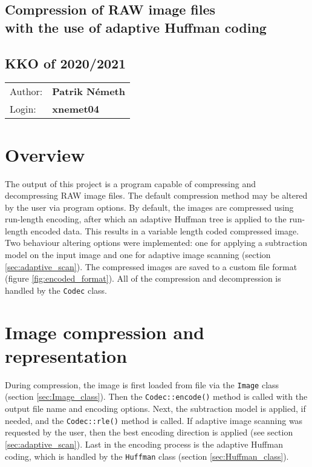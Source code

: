 \documentclass[pdftex, 11pt, a4paper, titlepage]{article}
\newcommand{\code}{\texttt}
\begin{document}
    \begin{center}
        \section*{Compression of RAW image files\\with the use of adaptive Huffman coding}
        \subsection*{KKO of 2020/2021}
        \begin{tabular}{ l l }
            Author: & \textbf{Patrik Németh} \\
            Login: & \textbf{xnemet04}
        \end{tabular}
    \end{center}

    \section{Overview}
    The output of this project is a program capable of compressing and decompressing RAW image files.
    The default compression method may be altered by the user via program options. By default, the
    images are compressed using run-length encoding, after which an adaptive Huffman tree is applied
    to the run-length encoded data. This results in a variable length coded compressed image.
    Two behaviour altering options were implemented: one for applying a subtraction model on the input
    image and one for adaptive image scanning (section \ref{sec:adaptive_scan}).
    The compressed images are saved to a custom file format (figure \ref{fig:encoded_format}).
    All of the compression and decompression is handled by the \code{Codec} class.

    \section{Image compression and representation}
    During compression, the image is first loaded from file via the \code{Image} class (section
    \ref{sec:Image_class}). Then the \code{Codec::encode()} method is called with the output file name
    and encoding options. Next, the subtraction model is applied, if needed, and the
    \code{Codec::rle()} method is called. If adaptive image scanning was requested by the user,
    then the best encoding direction is applied (see section \ref{sec:adaptive_scan}). Last in the
    encoding process is the adaptive Huffman coding, which is handled by the \code{Huffman} class
    (section \ref{sec:Huffman_class}).
\end{document}
